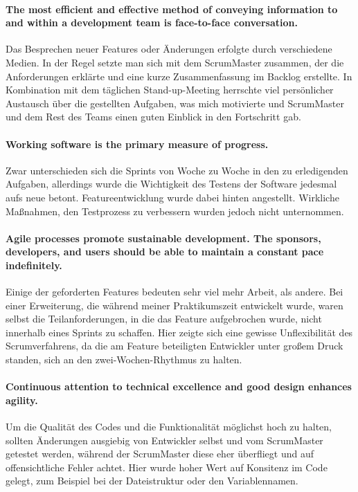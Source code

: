 \documentclass[ngerman]{scrartcl}
\begin{document}
\paragraph{The most efficient and effective method of conveying information to and within a development team is face-to-face conversation.}
Das Besprechen neuer Features oder Änderungen erfolgte durch verschiedene Medien. In der Regel setzte man sich mit dem ScrumMaster zusammen, der die Anforderungen erklärte und eine kurze Zusammenfassung im Backlog erstellte. In Kombination mit dem täglichen Stand-up-Meeting herrschte viel persönlicher Austausch über die gestellten Aufgaben, was mich motivierte und ScrumMaster und dem Rest des Teams einen guten Einblick in den Fortschritt gab. 

\paragraph{Working software is the primary measure of progress.}
Zwar unterschieden sich die Sprints von Woche zu Woche in den zu erledigenden Aufgaben, allerdings wurde die Wichtigkeit des Testens der Software jedesmal aufs neue betont. Featureentwicklung wurde dabei hinten angestellt. Wirkliche Maßnahmen, den Testprozess zu verbessern wurden jedoch nicht unternommen.  

\paragraph{Agile processes promote sustainable development. The sponsors, developers, and users should be able to maintain a constant pace indefinitely.}
Einige der geforderten Features bedeuten sehr viel mehr Arbeit, als andere. Bei einer Erweiterung, die während meiner Praktikumszeit entwickelt wurde, waren selbst die Teilanforderungen, in die das Feature aufgebrochen wurde, nicht innerhalb eines Sprints zu schaffen. Hier zeigte sich eine gewisse Unflexibilität des Scrumverfahrens, da die am Feature beteiligten Entwickler unter großem Druck standen, sich an den zwei-Wochen-Rhythmus zu halten.


\paragraph{Continuous attention to technical excellence and good design enhances agility.}
Um die Qualität des Codes und die Funktionalität möglichst hoch zu halten, sollten Änderungen ausgiebig von Entwickler selbst und vom ScrumMaster getestet werden, während der ScrumMaster diese eher überfliegt und auf offensichtliche Fehler achtet. Hier wurde hoher Wert auf Konsitenz im Code gelegt, zum Beispiel bei der Dateistruktur oder den Variablennamen.
\end{document}
